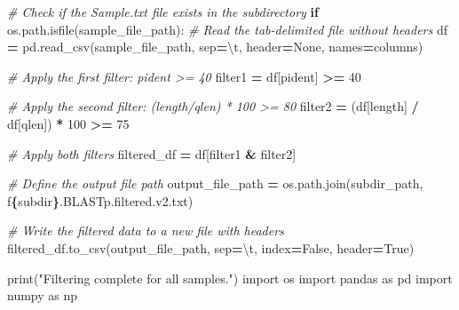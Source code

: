 \documentclass[
]{book}
\newenvironment{Shaded}{\begin{snugshade}}{\end{snugshade}}
\newcommand{\BuiltInTok}[1]{#1}
\newcommand{\CharTok}[1]{\textcolor[rgb]{0.31,0.60,0.02}{#1}}
\newcommand{\CommentTok}[1]{\textcolor[rgb]{0.56,0.35,0.01}{\textit{#1}}}
\newcommand{\ControlFlowTok}[1]{\textcolor[rgb]{0.13,0.29,0.53}{\textbf{#1}}}
\newcommand{\DecValTok}[1]{\textcolor[rgb]{0.00,0.00,0.81}{#1}}
\newcommand{\ImportTok}[1]{#1}
\newcommand{\NormalTok}[1]{#1}
\newcommand{\OperatorTok}[1]{\textcolor[rgb]{0.81,0.36,0.00}{\textbf{#1}}}
\newcommand{\SpecialCharTok}[1]{\textcolor[rgb]{0.81,0.36,0.00}{\textbf{#1}}}
\newcommand{\SpecialStringTok}[1]{\textcolor[rgb]{0.31,0.60,0.02}{#1}}
\newcommand{\StringTok}[1]{\textcolor[rgb]{0.31,0.60,0.02}{#1}}
\newcommand{\VariableTok}[1]{\textcolor[rgb]{0.00,0.00,0.00}{#1}}
\begin{document}
\begin{Shaded}
\begin{Highlighting}[]
        \CommentTok{\# Check if the Sample.txt file exists in the subdirectory}
        \ControlFlowTok{if}\NormalTok{ os.path.isfile(sample\_file\_path):}
            \CommentTok{\# Read the tab{-}delimited file without headers}
\NormalTok{            df }\OperatorTok{=}\NormalTok{ pd.read\_csv(sample\_file\_path, sep}\OperatorTok{=}\StringTok{\textquotesingle{}}\CharTok{\textbackslash{}t}\StringTok{\textquotesingle{}}\NormalTok{, header}\OperatorTok{=}\VariableTok{None}\NormalTok{, names}\OperatorTok{=}\NormalTok{columns)}
            
            \CommentTok{\# Apply the first filter: pident \textgreater{}= 40}
\NormalTok{            filter1 }\OperatorTok{=}\NormalTok{ df[}\StringTok{\textquotesingle{}pident\textquotesingle{}}\NormalTok{] }\OperatorTok{\textgreater{}=} \DecValTok{40}
            
            \CommentTok{\# Apply the second filter: (length/qlen) * 100 \textgreater{}= 80}
\NormalTok{            filter2 }\OperatorTok{=}\NormalTok{ (df[}\StringTok{\textquotesingle{}length\textquotesingle{}}\NormalTok{] }\OperatorTok{/}\NormalTok{ df[}\StringTok{\textquotesingle{}qlen\textquotesingle{}}\NormalTok{]) }\OperatorTok{*} \DecValTok{100} \OperatorTok{\textgreater{}=} \DecValTok{75}

            \CommentTok{\# Apply both filters}
\NormalTok{            filtered\_df }\OperatorTok{=}\NormalTok{ df[filter1 }\OperatorTok{\&}\NormalTok{ filter2]}
            
            \CommentTok{\# Define the output file path}
\NormalTok{            output\_file\_path }\OperatorTok{=}\NormalTok{ os.path.join(subdir\_path, }\SpecialStringTok{f\textquotesingle{}}\SpecialCharTok{\{}\NormalTok{subdir}\SpecialCharTok{\}}\SpecialStringTok{.BLASTp.filtered.v2.txt\textquotesingle{}}\NormalTok{)}
            
            \CommentTok{\# Write the filtered data to a new file with headers}
\NormalTok{            filtered\_df.to\_csv(output\_file\_path, sep}\OperatorTok{=}\StringTok{\textquotesingle{}}\CharTok{\textbackslash{}t}\StringTok{\textquotesingle{}}\NormalTok{, index}\OperatorTok{=}\VariableTok{False}\NormalTok{, header}\OperatorTok{=}\VariableTok{True}\NormalTok{)}

\BuiltInTok{print}\NormalTok{(}\StringTok{"Filtering complete for all samples."}\NormalTok{)}
\ImportTok{import}\NormalTok{ os}
\ImportTok{import}\NormalTok{ pandas }\ImportTok{as}\NormalTok{ pd}
\ImportTok{import}\NormalTok{ numpy }\ImportTok{as}\NormalTok{ np}


\end{Highlighting}
\end{Shaded}
\end{document}
